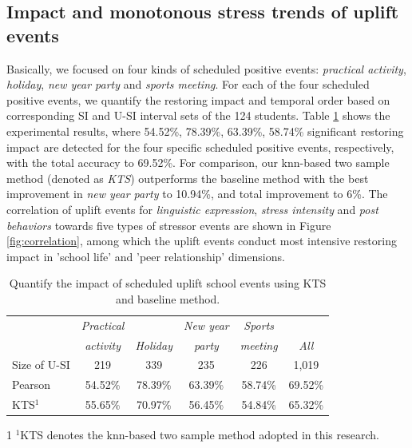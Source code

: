 \subsection{Impact and monotonous stress trends of uplift events}
Basically, we focused on four kinds of scheduled positive events:
\emph{practical activity}, \emph{holiday}, \emph{new year party} and \emph{sports meeting}.
For each of the four scheduled positive events,
we quantify the restoring impact and temporal order
based on corresponding SI and U-SI interval sets of the 124 students.
Table \ref{tab:schedule} shows the experimental results,
where 54.52\%, 78.39\%, 63.39\%, 58.74\% significant restoring impact are detected for the four specific scheduled positive events, respectively, with the total accuracy to 69.52\%.
For comparison,
our knn-based two sample method (denoted as \emph{KTS}) outperforms the baseline method
with the best improvement in \emph{new year party} to 10.94\%,
and total improvement to 6\%.
The correlation of uplift events for \emph{linguistic expression},
\emph{stress intensity} and \emph{post behaviors} towards five types of stressor events
are shown in Figure \ref{fig:correlation},
among which the uplift events conduct most intensive restoring impact in 'school life' and 'peer relationship' dimensions.

\begin{table}
\begin{center}
\caption{Quantify the impact of scheduled uplift school events using KTS and baseline method.}
\begin{tabular}{l c c c c c} \\ \hline \hline
&	\emph{Practical}	&	         	&	\emph{New year}	&	\emph{Sports}	&	\emph{}	\\
&	\emph{activity}	&	\emph{Holiday}	&	\emph{party}	&	\emph{meeting}	&	\emph{All}	\\ \hline
Size of U-SI	&	219 	&	339 	&	235 	&	226 	&	1,019 	\\
Pearson         &54.52\%	&	78.39\%	&	63.39\%	&	58.74\%	&	69.52\% \\
KTS$^1$             &55.65\%	&	70.97\%	&	56.45\%	&	54.84\%	&	65.32\% \\
\hline \hline
\end{tabular}
\begin{tablenotes}
\footnotesize
\item[1] $^1$KTS denotes the knn-based two sample method adopted in this research.
\end{tablenotes}
\label{tab:schedule}
\end{center}
\end{table}


